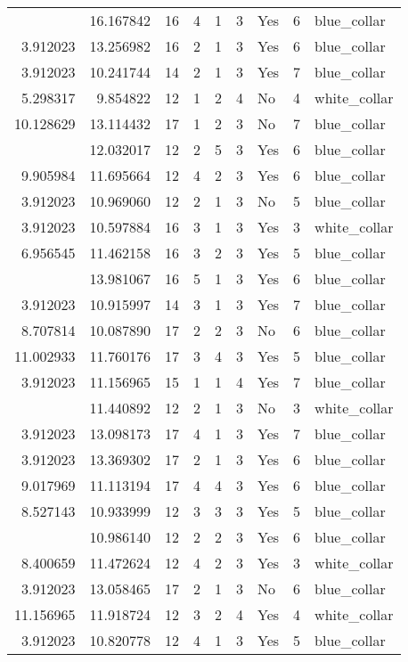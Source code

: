 \documentclass[
]{article}
\begin{document}
\begin{longtable}[t]{rrrrrllrl}
\addlinespace
3.912023 & 16.167842 & 16 & 4 & 1 & 3 & Yes & 6 & blue\_collar\\
3.912023 & 13.256982 & 16 & 2 & 1 & 3 & Yes & 6 & blue\_collar\\
3.912023 & 10.241744 & 14 & 2 & 1 & 3 & Yes & 7 & blue\_collar\\
5.298317 & 9.854822 & 12 & 1 & 2 & 4 & No & 4 & white\_collar\\
10.128629 & 13.114432 & 17 & 1 & 2 & 3 & No & 7 & blue\_collar\\
\addlinespace
8.086410 & 12.032017 & 12 & 2 & 5 & 3 & Yes & 6 & blue\_collar\\
9.905984 & 11.695664 & 12 & 4 & 2 & 3 & Yes & 6 & blue\_collar\\
3.912023 & 10.969060 & 12 & 2 & 1 & 3 & No & 5 & blue\_collar\\
3.912023 & 10.597884 & 16 & 3 & 1 & 3 & Yes & 3 & white\_collar\\
6.956545 & 11.462158 & 16 & 3 & 2 & 3 & Yes & 5 & blue\_collar\\
\addlinespace
3.912023 & 13.981067 & 16 & 5 & 1 & 3 & Yes & 6 & blue\_collar\\
3.912023 & 10.915997 & 14 & 3 & 1 & 3 & Yes & 7 & blue\_collar\\
8.707814 & 10.087890 & 17 & 2 & 2 & 3 & No & 6 & blue\_collar\\
11.002933 & 11.760176 & 17 & 3 & 4 & 3 & Yes & 5 & blue\_collar\\
3.912023 & 11.156965 & 15 & 1 & 1 & 4 & Yes & 7 & blue\_collar\\
\addlinespace
3.912023 & 11.440892 & 12 & 2 & 1 & 3 & No & 3 & white\_collar\\
3.912023 & 13.098173 & 17 & 4 & 1 & 3 & Yes & 7 & blue\_collar\\
3.912023 & 13.369302 & 17 & 2 & 1 & 3 & Yes & 6 & blue\_collar\\
9.017969 & 11.113194 & 17 & 4 & 4 & 3 & Yes & 6 & blue\_collar\\
8.527143 & 10.933999 & 12 & 3 & 3 & 3 & Yes & 5 & blue\_collar\\
\addlinespace
5.521461 & 10.986140 & 12 & 2 & 2 & 3 & Yes & 6 & blue\_collar\\
8.400659 & 11.472624 & 12 & 4 & 2 & 3 & Yes & 3 & white\_collar\\
3.912023 & 13.058465 & 17 & 2 & 1 & 3 & No & 6 & blue\_collar\\
11.156965 & 11.918724 & 12 & 3 & 2 & 4 & Yes & 4 & white\_collar\\
3.912023 & 10.820778 & 12 & 4 & 1 & 3 & Yes & 5 & blue\_collar\\

\end{longtable}
\end{document}
